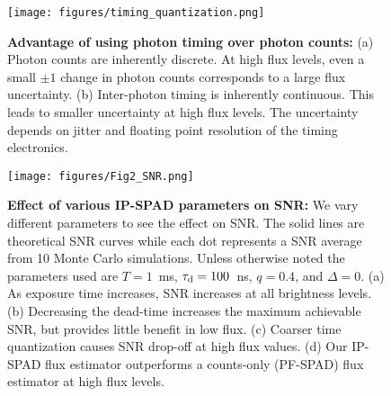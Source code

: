 \begin{figure}[!t]
	\centering \texttt{[image: figures/timing\_quantization.png]}
	\caption{\textbf{Advantage of using photon timing over photon counts:}
	(a) Photon counts are inherently discrete. At high flux levels, even a
	small $\pm 1$ change in photon counts corresponds to a large flux uncertainty.
	(b) Inter-photon timing is inherently continuous. This leads to smaller
	uncertainty at high flux levels. The uncertainty depends on jitter and
	floating point resolution of the timing electronics. \label{fig:timing_quantization_noise}}
	\vspace{-0.15in}
\end{figure}

\begin{figure}[!t]
\centering \texttt{[image: figures/Fig2\_SNR.png]}
\caption{\textbf{Effect of various IP-SPAD parameters on SNR:} We vary
different parameters to see the effect on SNR. The solid lines are theoretical
SNR curves while each dot represents a SNR average from 10 Monte Carlo
simulations. Unless otherwise noted the parameters used are $T=1$~\si{\ms},
$\tau_\text{d}=100$~\si{\ns}, $q=0.4$, and $\Delta=0$.  (a) As exposure time increases,
SNR increases at all brightness levels. (b) Decreasing the dead-time increases
the maximum achievable SNR, but provides little benefit in low flux.
(c) Coarser time quantization causes SNR drop-off at high flux values. (d) Our
IP-SPAD flux estimator outperforms a counts-only (PF-SPAD) flux estimator
\cite{ingle2019high} at high flux levels.\label{fig:snr}}
\vspace{-0.15in}
\end{figure}

